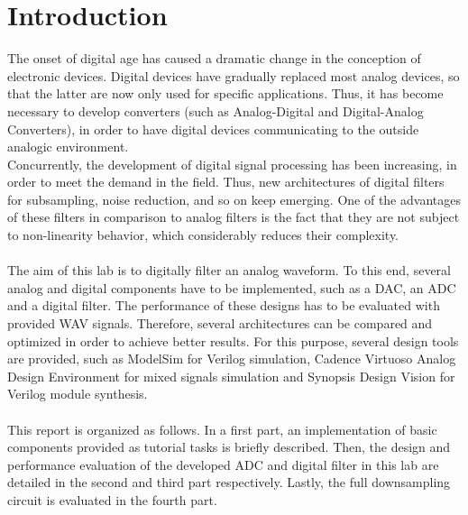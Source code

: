 \chapter*{Introduction}

The onset of digital age has caused a dramatic change in the conception of electronic devices. Digital devices have gradually replaced most analog devices, so that the latter are now only used for specific applications. Thus, it has become necessary to develop converters (such as Analog-Digital and Digital-Analog Converters), in order to have digital devices communicating to the outside analogic environment.\\
Concurrently, the development of digital signal processing has been increasing, in order to meet the demand in the field. Thus, new architectures of digital filters for subsampling, noise reduction, and so on keep emerging. One of the advantages of these filters in comparison to analog filters is the fact that they are not subject to non-linearity behavior, which considerably reduces their complexity.\\
\\
The aim of this lab is to digitally filter an analog waveform. To this end, several analog and digital components have to be implemented, such as a DAC, an ADC and a digital filter. The performance of these designs has to be evaluated with provided WAV signals. Therefore, several architectures can be compared and optimized in order to achieve better results. For this purpose, several design tools are provided, such as ModelSim for Verilog simulation, Cadence Virtuoso Analog Design Environment for mixed signals simulation and Synopsis Design Vision for Verilog module synthesis.\\
\\
This report is organized as follows. In a first part, an implementation of basic components provided as tutorial tasks is briefly described. Then, the design and performance evaluation of the developed ADC and digital filter in this lab are detailed in the second and third part respectively. Lastly, the full downsampling circuit is evaluated in the fourth part.
